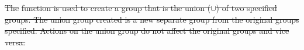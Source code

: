 \documentclass[12pt]{report} %
\providecommand{\DIFdeltex}[1]{{\protect\color{red}\sout{#1}}}                      %
\providecommand{\DIFdelbegin}{} %
\providecommand{\DIFdel}[1]{\texorpdfstring{\DIFdeltex{#1}}{}} %
\newcommand{\DIFscaledelfig}{0.5}
\newlength{\DIFdelgraphicswidth} %
\newlength{\DIFdelgraphicsheight} %
\newcommand{\DIFdelincludegraphics}[2][]{%
\sbox{\DIFdelgraphicsbox}{\DIFOincludegraphics[#1]{#2}}%
\settoboxwidth{\DIFdelgraphicswidth}{\DIFdelgraphicsbox} %
\settoboxtotalheight{\DIFdelgraphicsheight}{\DIFdelgraphicsbox} %
\scalebox{\DIFscaledelfig}{%
\parbox[b]{\DIFdelgraphicswidth}{\usebox{\DIFdelgraphicsbox}\\[-\baselineskip] \rule{\DIFdelgraphicswidth}{0em}}\llap{\resizebox{\DIFdelgraphicswidth}{\DIFdelgraphicsheight}{%
\setlength{\unitlength}{\DIFdelgraphicswidth}%
\begin{picture}(1,1)%
\thicklines\linethickness{2pt} %
{\color[rgb]{1,0,0}\put(0,0){\framebox(1,1){}}}%
{\color[rgb]{1,0,0}\put(0,0){\line( 1,1){1}}}%
{\color[rgb]{1,0,0}\put(0,1){\line(1,-1){1}}}%
\end{picture}%
}\hspace*{3pt}}} %
} %
\DeclareRobustCommand{\DIFdelbegin}{\DIFOdelbegin \let\includegraphics\DIFdelincludegraphics} %
\begin{document}
\DIFdelbegin %


\DIFdel{The }%
\DIFdel{function is used to create a group that is the union ($\cup$) of two specified groups.
The union group created is a new separate group from the original groups specified.
Actions on the union group do not affect the original groups and vice versa.
}%

\end{document}
